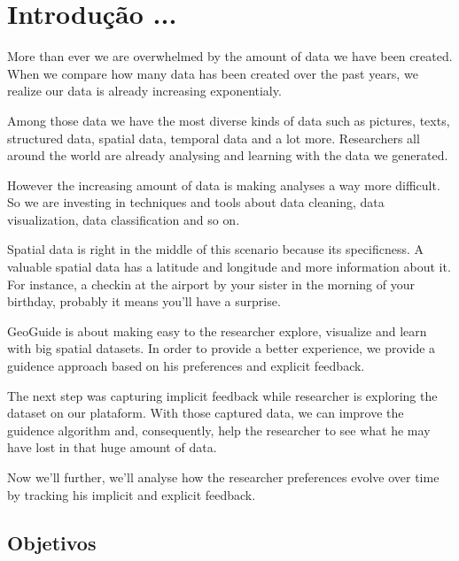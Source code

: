 \chapter{Introdução ...}
\label{chap:introducao}



More than ever we are overwhelmed by the amount of data we have been
created. When we compare how many data has been created over the past years, we realize our data is already increasing exponentialy.

Among those data we have the most diverse kinds of data such as pictures, texts, structured data, spatial data, temporal data and a lot more. Researchers all around the world are already analysing and learning with the data we generated.

However the increasing amount of data is making analyses a way more difficult. So we are investing in techniques and tools about data cleaning, data visualization, data classification and so on.

Spatial data is right in the middle of this scenario because its specificness. A valuable spatial data has a latitude and longitude and more information about it. For instance, a checkin at the airport by your sister in the morning of your birthday, probably it means you'll have a surprise.

GeoGuide is about making easy to the researcher explore, visualize and learn with big spatial datasets. In order to provide a better experience, we provide a guidence approach based on his preferences and explicit feedback.

The next step was capturing implicit feedback while researcher is exploring the dataset on our plataform. With those captured data, we can improve the guidence algorithm and, consequently, help the researcher to see what he may have lost in that huge amount of data.

Now we'll further, we'll analyse how the researcher preferences evolve over time by tracking his implicit and explicit feedback.

\section{Objetivos}


